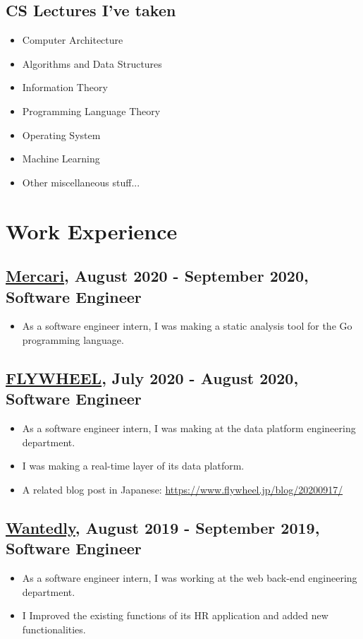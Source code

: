 \documentclass{article}
\begin{document}
  \subsection*{CS Lectures I've taken}
    \begin{itemize}
      \item Computer Architecture
      \item Algorithms and Data Structures
      \item Information Theory
      \item Programming Language Theory
      \item Operating System
      \item Machine Learning
      \item Other miscellaneous stuff...
    \end{itemize}

\section*{Work Experience}
  \subsection*{\href{https://about.mercari.com/en/}{Mercari}, August 2020 - September 2020, Software Engineer}
    \begin{itemize}
      \item As a software engineer intern, I was making a static analysis tool for the Go programming language.
    \end{itemize}

  \subsection*{\href{https://www.flywheel.jp/}{FLYWHEEL}, July 2020 - August 2020, Software Engineer}
    \begin{itemize}
      \item As a software engineer intern, I was making at the data platform engineering department.
      \item I was making a real-time layer of its data platform.
      \item A related blog post in Japanese: \url{https://www.flywheel.jp/blog/20200917/}
    \end{itemize}

  \subsection*{\href{https://wantedlyinc.com/ja}{Wantedly}, August 2019 - September 2019, Software Engineer}
    \begin{itemize}
      \item As a software engineer intern, I was working at the web back-end engineering department.
      \item I Improved the existing functions of its HR application and added new functionalities.
    \end{itemize}
\end{document}

